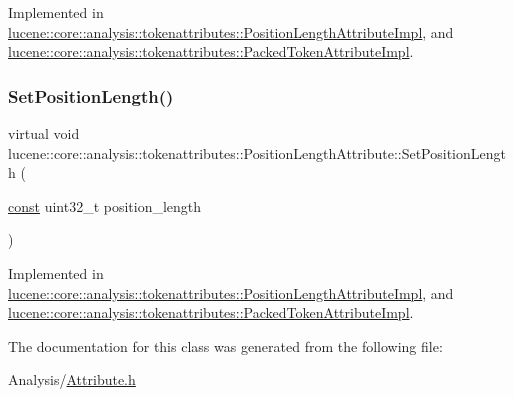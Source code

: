 Implemented in \mbox{\hyperlink{classlucene_1_1core_1_1analysis_1_1tokenattributes_1_1PositionLengthAttributeImpl_a79dfa19c547152a263d601dfaf62fe9b}{lucene\+::core\+::analysis\+::tokenattributes\+::\+Position\+Length\+Attribute\+Impl}}, and \mbox{\hyperlink{classlucene_1_1core_1_1analysis_1_1tokenattributes_1_1PackedTokenAttributeImpl_a4b5a93a1d9b61cf1504b382d24c1e6d9}{lucene\+::core\+::analysis\+::tokenattributes\+::\+Packed\+Token\+Attribute\+Impl}}.

\mbox{\label{classlucene_1_1core_1_1analysis_1_1tokenattributes_1_1PositionLengthAttribute_a514415965bae0dd392cbb8d65ea4d808}} 
\subsubsection{\texorpdfstring{Set\+Position\+Length()}{SetPositionLength()}}
{\footnotesize\ttfamily virtual void lucene\+::core\+::analysis\+::tokenattributes\+::\+Position\+Length\+Attribute\+::\+Set\+Position\+Length (\begin{DoxyParamCaption}\item[{\mbox{\hyperlink{ZlibCrc32_8h_a2c212835823e3c54a8ab6d95c652660e}{const}} uint32\+\_\+t}]{position\+\_\+length }\end{DoxyParamCaption})\hspace{0.3cm}{\ttfamily [pure virtual]}}



Implemented in \mbox{\hyperlink{classlucene_1_1core_1_1analysis_1_1tokenattributes_1_1PositionLengthAttributeImpl_a8b09235c697cf5157ca4351653fcbaf4}{lucene\+::core\+::analysis\+::tokenattributes\+::\+Position\+Length\+Attribute\+Impl}}, and \mbox{\hyperlink{classlucene_1_1core_1_1analysis_1_1tokenattributes_1_1PackedTokenAttributeImpl_a3d721b90985cf600d2d44bb5f156d05d}{lucene\+::core\+::analysis\+::tokenattributes\+::\+Packed\+Token\+Attribute\+Impl}}.



The documentation for this class was generated from the following file\+:\begin{DoxyCompactItemize}
\item 
Analysis/\mbox{\hyperlink{Analysis_2Attribute_8h}{Attribute.\+h}}\end{DoxyCompactItemize}
